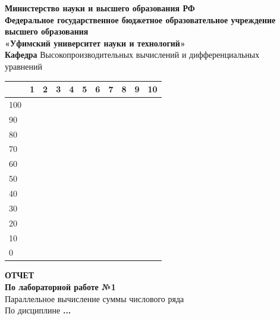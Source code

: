 



	
	\begin{titlepage}
		\centering
		
		\textbf{Министерство науки и высшего образования РФ} \\
		\textbf{Федеральное государственное бюджетное образовательное учреждение высшего образования} \\
		\textbf{«Уфимский университет науки и технологий»} \\[0.5cm]
		
		\textbf{Кафедра} Высокопроизводительных вычислений и дифференциальных \\[0.2cm] уравнений \\[0.1cm]
		
		\begin{table}[H]
			\noindent
			\hspace{5.5cm}
			\footnotesize
			\renewcommand{\arraystretch}{1.49}
			\begin{tabular}{|p{0.5cm}|p{0.4cm}|p{0.4cm}|p{0.4cm}|p{0.4cm}|p{0.4cm}|p{0.4cm}|p{0.4cm}|p{0.4cm}|p{0.4cm}|p{0.4cm}|}
				\hline
				& 1 & 2 & 3 & 4 & 5 & 6 & 7 & 8 & 9 & 10 \\ \hline
				100 & & & & & & & & & & \\ \hline
				90 & & & & & & & & & & \\ \hline
				80 & & & & & & & & & & \\ \hline
				70 & & & & & & & & & & \\ \hline
				60 & & & & & & & & & & \\ \hline
				50 & & & & & & & & & & \\ \hline
				40 & & & & & & & & & & \\ \hline
				30 & & & & & & & & & & \\ \hline
				20 & & & & & & & & & & \\ \hline
				10 & & & & & & & & & & \\ \hline
				0 & & & & & & & & & & \\ \hline
			\end{tabular}
		\end{table}
		
		\vspace{-0.2cm}
		
		{\textbf{ОТЧЕТ}} \\[0.6cm]
		{\textbf{По лабораторной работе №1} \\[0.3cm]
			{Параллельное вычисление суммы числового ряда} \\[0.3cm]
			{По дисциплине \textbf{...}}}
		

\end{titlepage}
